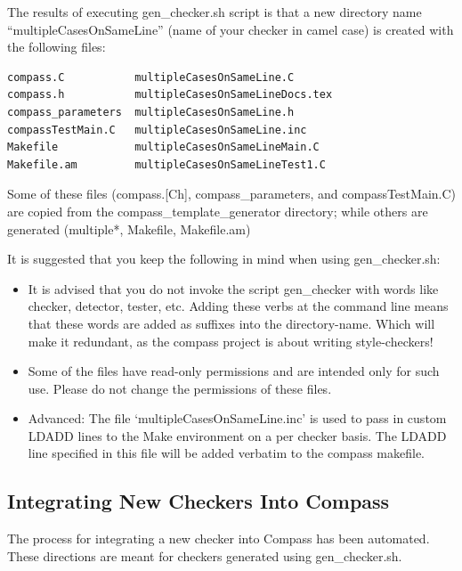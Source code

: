 The results of executing gen\_checker.sh script is that a new directory name 
``multipleCasesOnSameLine''
(name of your checker in camel case) is created with the following files:

\begin{verbatim}
compass.C           multipleCasesOnSameLine.C
compass.h           multipleCasesOnSameLineDocs.tex
compass_parameters  multipleCasesOnSameLine.h
compassTestMain.C   multipleCasesOnSameLine.inc
Makefile            multipleCasesOnSameLineMain.C
Makefile.am         multipleCasesOnSameLineTest1.C
\end{verbatim}

Some of these files (compass.[Ch], compass\_parameters, and compassTestMain.C)
are copied from the compass\_template\_generator directory; while others are
generated (multiple*, Makefile, Makefile.am)

It is suggested that you keep the following in mind when using gen\_checker.sh:
\begin{itemize}
\item
   It is advised that you do not invoke the script gen\_checker with words
   like checker, detector, tester, etc. Adding these verbs at the command
   line means that these words are added as suffixes into the
   directory-name. Which will make it redundant, as the compass project is
   about writing style-checkers!
\item
   Some of the files have read-only permissions and are intended only for
   such use. Please do not change the permissions of these files.
\item
Advanced: The file `multipleCasesOnSameLine.inc' is used to pass in custom LDADD lines
to the Make environment on a per checker basis. The LDADD line specified in
this file will be added verbatim to the compass makefile.

\end{itemize}

\subsection{Integrating New Checkers Into Compass}
\label{howToIntegrateNewCheckers}

The process for integrating a new checker into Compass has been automated. These directions
are meant for checkers generated using gen\_checker.sh.

